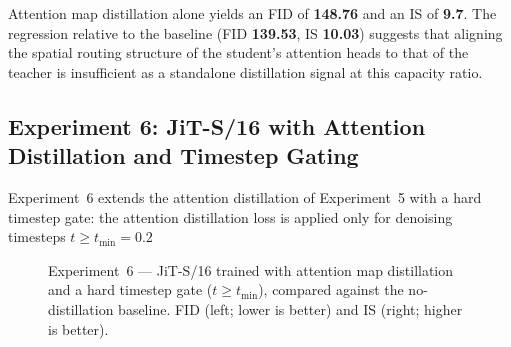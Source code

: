 Attention map distillation alone yields an FID of \textbf{148.76} and an
IS of \textbf{9.7}. The regression relative to the
baseline (FID \textbf{139.53}, IS \textbf{10.03}) suggests that aligning
the spatial routing structure of the student's attention heads to that of
the teacher is insufficient as a standalone distillation signal at this capacity ratio.

\subsection{Experiment 6: JiT-S/16 with Attention Distillation and Timestep Gating}
\label{subsec:exp6}

Experiment~6 extends the attention distillation of Experiment~5 with a
hard timestep gate: the attention distillation loss is applied only for
denoising timesteps $t \geq t_{\min} = 0.2$

\begin{figure}[ht]
    \centering
    \begin{subfigure}[b]{0.44\linewidth}
        \centering
    \end{subfigure}
    \hfill
    \begin{subfigure}[b]{0.44\linewidth}
        \centering
    \end{subfigure}
    \caption{Experiment~6 — JiT-S/16 trained with attention map
    distillation and a hard timestep gate ($t \geq t_{\min}$), compared
    against the no-distillation baseline. FID (left; lower is better) and
    IS (right; higher is better).}
    \label{fig:exp6_results}
\end{figure}

